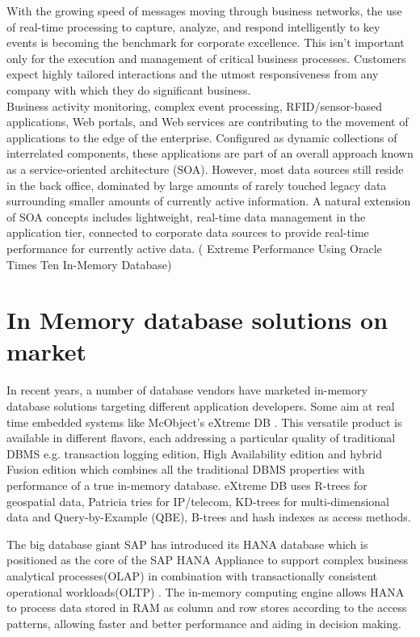 \documentclass[10pt]{article} %
\begin{document}
With the growing speed of messages moving through business networks, the use of real-time processing to capture, analyze, and respond intelligently to key events is becoming the benchmark for corporate excellence. This isn’t important only for the execution and management of critical business processes. Customers expect highly tailored interactions and the utmost responsiveness from any company with which they do significant business.\\

Business activity monitoring, complex event processing, RFID/sensor-based applications, Web portals, and Web services are contributing to the movement of applications to the edge of the enterprise. Configured as dynamic collections of interrelated components, these applications are part of an overall approach known as a service-oriented architecture (SOA). However, most data sources still reside in the back office, dominated by large amounts of rarely touched legacy data surrounding smaller amounts of currently active information. A natural extension of SOA concepts includes lightweight, real-time data management in the application tier, connected to corporate data sources to provide real-time performance for currently active data. ( Extreme Performance Using Oracle Times Ten In-Memory Database)

\section{In Memory database solutions on market}
In recent years, a number of database vendors have marketed in-memory database solutions targeting different application developers. Some aim at real time embedded systems like McObject’s eXtreme DB \cite{Mcobject-RealvsImmi}. This versatile product is available in different flavors, each addressing a particular quality of traditional DBMS e.g. transaction logging edition, High Availability edition and hybrid Fusion edition which combines all the traditional DBMS properties with performance of a true in-memory database. eXtreme DB uses R-trees for geospatial data, Patricia tries for IP/telecom, KD-trees for multi-dimensional data and Query-by-Example (QBE), B-trees and hash indexes as access methods. 

The big database giant SAP has introduced its HANA database which is positioned as the core of the SAP HANA Appliance to support complex business analytical processes(OLAP) in combination with transactionally consistent operational workloads(OLTP) \cite{farber2012sap}. The in-memory computing engine allows HANA to process data stored in RAM as column and row stores according to the access patterns, allowing faster and better performance and aiding in decision making. 
\end{document}
